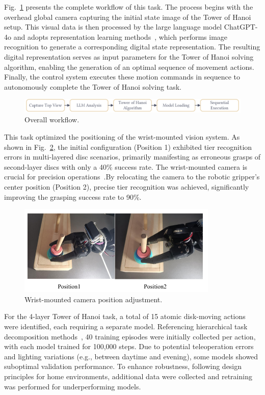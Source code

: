 \documentclass[runningheads]{llncs}
\begin{document}
Fig.~\ref{fig10} presents the complete workflow of this task. The process begins with the overhead global camera capturing the initial state image of the Tower of Hanoi setup. This visual data is then processed by the large language model ChatGPT-4o and adopts representation learning methods~\cite{ref5}, which performs image recognition to generate a corresponding digital state representation. The resulting digital representation serves as input parameters for the Tower of Hanoi solving algorithm, enabling the generation of an optimal sequence of movement actions. Finally, the control system executes these motion commands in sequence to autonomously complete the Tower of Hanoi solving task.

\begin{figure}[htbp]
\centering
\includegraphics[width=\textwidth]{10}
\caption{Overall workflow.}
 \label{fig10}
\end{figure}

\noindent This task optimized the positioning of the wrist-mounted vision system. As shown in Fig.~\ref{fig12}, the initial configuration (Position 1) exhibited tier recognition errors in multi-layered disc scenarios, primarily manifesting as erroneous grasps of second-layer discs with only a 40\% success rate. The wrist-mounted camera is crucial for precision operations~\cite{ref6}.By relocating the camera to the robotic gripper's center position (Position 2), precise tier recognition was achieved, significantly improving the grasping success rate to 90\%.

\begin{figure}[htbp]
\centering
\includegraphics[width=0.85\textwidth]{fig12.pdf}
\caption{Wrist-mounted camera position adjustment.} \label{fig12}
\end{figure}



\noindent For the 4-layer Tower of Hanoi task, a total of 15 atomic disk-moving actions were identified, each requiring a separate model. Referencing hierarchical task decomposition methods~\cite{ref7}, 40 training episodes were initially collected per action, with each model trained for 100,000 steps. Due to potential teleoperation errors and lighting variations (e.g., between daytime and evening)\cite{ref8}, some models showed suboptimal validation performance. To enhance robustness, following design principles for home environments\cite{ref9}, additional data were collected and retraining was performed for underperforming models.
\end{document}
